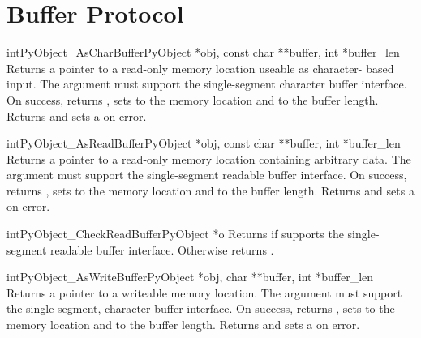 \section{Buffer Protocol \label{abstract-buffer}}

\begin{cfuncdesc}{int}{PyObject_AsCharBuffer}{PyObject *obj,
                                              const char **buffer,
                                              int *buffer_len}
  Returns a pointer to a read-only memory location useable as character-
  based input.  The  argument must support the single-segment
  character buffer interface.  On success, returns , sets
   to the memory location and  to the buffer
  length.  Returns  and sets a  on error.
\end{cfuncdesc}

\begin{cfuncdesc}{int}{PyObject_AsReadBuffer}{PyObject *obj,
                                              const char **buffer,
                                              int *buffer_len}
  Returns a pointer to a read-only memory location containing
  arbitrary data.  The  argument must support the
  single-segment readable buffer interface.  On success, returns
  , sets  to the memory location and 
  to the buffer length.  Returns  and sets a
   on error.
\end{cfuncdesc}

\begin{cfuncdesc}{int}{PyObject_CheckReadBuffer}{PyObject *o}
  Returns  if  supports the single-segment readable
  buffer interface.  Otherwise returns .
\end{cfuncdesc}

\begin{cfuncdesc}{int}{PyObject_AsWriteBuffer}{PyObject *obj,
                                               char **buffer,
                                               int *buffer_len}
  Returns a pointer to a writeable memory location.  The 
  argument must support the single-segment, character buffer
  interface.  On success, returns , sets  to the
  memory location and  to the buffer length.  Returns
   and sets a  on error.
\end{cfuncdesc}
